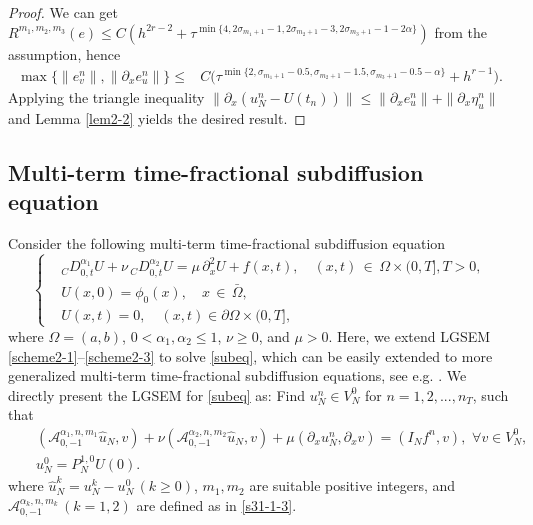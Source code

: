 \documentclass[10pt]{siamltex}
\newcommand{\px}[1][x]{\partial_{#1}}
\begin{document}
\begin{proof}
We can get
$R^{m_1,m_2,m_3}(e) \leq C (h^{2r-2}+\tau^{\min\{4,2{\sigma_{m_1+1}-1},2\sigma_{m_2+1}-3,2\sigma_{m_3+1}-1-2\alpha\}} )$ from the assumption, hence
\begin{equation*}\begin{aligned}
\max\{\|e_v^{n}\|, \|\px[x]e_u^{n}\|\}\leq& C\Big(
\tau^{\min\{2,{\sigma_{m_1+1}-0.5},\sigma_{m_2+1}-1.5,\sigma_{m_3+1}-0.5-\alpha\}}+ h^{r-1}\Big).
\end{aligned}\end{equation*}
Applying the triangle inequality
$\|\px(u_N^{n}-U(t_n))\|\leq \|\px e_u^{n}\|+\|\px \eta_u^{n}\|$ and Lemma \ref{lem2-2}
yields the desired result.
\end{proof}




\subsection{Multi-term time-fractional subdiffusion equation}
Consider the following multi-term time-fractional subdiffusion equation
\begin{equation}\label{subeq}
\left\{\begin{aligned}
&{}_{C}D^{\alpha_1}_{0,t}U+\nu\,{}_{C}D^{\alpha_2}_{0,t}U=\mu\,\px^2U+f(x,t),
{\quad}(x,t){\,\in\,}\Omega{\times}(0,T],T>0,\\
&U(x,0)=\phi_0(x),{\quad}x{\,\in\,}\bar{\Omega},\\
&U(x,t)=0,{\quad}(x,t)\in\partial\Omega\times(0,T],
\end{aligned}\right.
\end{equation}
where $\Omega=(a,b)$, $0<\alpha_1,\alpha_2\leq 1$, $\nu\geq0$, and $\mu>0$.
Here, we  extend  LGSEM \eqref{scheme2-1}--\eqref{scheme2-3}  to solve
\eqref{subeq}, which can be easily  extended to
more generalized multi-term time-fractional subdiffusion equations,
see e.g. \cite{JinLaz-etal15,Liu-etal13,RenSun14}.
We directly present the LGSEM   for \eqref{subeq} as:
Find $u_N^{n}\in V_N^0$ for $n=1,2,...,n_T$,  such that
\begin{eqnarray}
&&\left(\mathcal{{A}}_{0,-1}^{{\alpha_1},n,m_1} \hat{u}_N ,v\right)
+\nu\left(\mathcal{{A}}_{0,-1}^{{\alpha_2},n,m_2} \hat{u}_N ,v\right)
+\mu(\px u_N^{n},\px v)=(I_Nf^{n},v),\,\,\forall v\in V_N^0, \label{scheme3-1}\\
&&u_N^0=P_N^{1,0}U(0).\label{scheme3-3}
\end{eqnarray}
where $\hat{u}_N^{k}=u_N^{k}-u_N^0\,(k\geq 0)$, $m_1,m_2$ are suitable positive integers,
and $\mathcal{{A}}_{0,-1}^{\alpha_k,n,m_k}\,(k=1,2)$
are defined as in \eqref{s31-1-3}.
\end{document}
